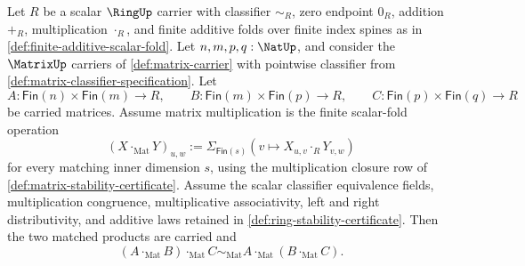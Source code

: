 \begin{theorem}
\label{thm:matrix-product-associativity-from-scalar-folds}
Let $R$ be a scalar $\RingUp$ carrier with classifier $\sim_R$, zero endpoint
$0_R$, addition $+_R$, multiplication $\cdot_R$, and finite additive folds over
finite index spines as in \autoref{def:finite-additive-scalar-fold}. Let
$n,m,p,q:\NatUp$, and consider the $\MatrixUp$ carriers of
\autoref{def:matrix-carrier} with pointwise classifier from
\autoref{def:matrix-classifier-specification}. Let
$$
A:\mathsf{Fin}(n)\times\mathsf{Fin}(m)\to R,
\qquad
B:\mathsf{Fin}(m)\times\mathsf{Fin}(p)\to R,
\qquad
C:\mathsf{Fin}(p)\times\mathsf{Fin}(q)\to R
$$
be carried matrices. Assume matrix multiplication is the finite scalar-fold
operation
$$
(X\cdot_{\mathrm{Mat}}Y)_{u,w}:=
\Sigma_{\mathsf{Fin}(s)}(v\mapsto X_{u,v}\cdot_RY_{v,w})
$$
for every matching inner dimension $s$, using the multiplication closure row of
\autoref{def:matrix-stability-certificate}. Assume the scalar classifier
equivalence fields, multiplication congruence, multiplicative associativity,
left and right distributivity, and additive laws retained in
\autoref{def:ring-stability-certificate}. Then the two matched products are
carried and
$$
(A\cdot_{\mathrm{Mat}}B)\cdot_{\mathrm{Mat}}C
\sim_{\mathrm{Mat}}
A\cdot_{\mathrm{Mat}}(B\cdot_{\mathrm{Mat}}C).
$$
\end{theorem}

